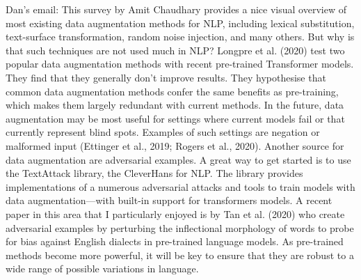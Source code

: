 Dan's email:
This survey by Amit Chaudhary provides a nice visual overview of most existing data augmentation methods for NLP, including lexical substitution, text-surface transformation, random noise injection, and many others. But why is that such techniques are not used much in NLP? Longpre et al. (2020) test two popular data augmentation methods with recent pre-trained Transformer models. They find that they generally don’t improve results. They hypothesise that common data augmentation methods confer the same benefits as pre-training, which makes them largely redundant with current methods. In the future, data augmentation may be most useful for settings where current models fail or that currently represent blind spots. Examples of such settings are negation or malformed input (Ettinger et al., 2019; Rogers et al., 2020).
Another source for data augmentation are adversarial examples. A great way to get started is to use the TextAttack library, the CleverHans for NLP. The library provides implementations of a numerous adversarial attacks and tools to train models with data augmentation—with built-in support for transformers models. A recent paper in this area that I particularly enjoyed is by Tan et al. (2020) who create adversarial examples by perturbing the inflectional morphology of words to probe for bias against English dialects in pre-trained language models. As pre-trained methods become more powerful, it will be key to ensure that they are robust to a wide range of possible variations in language.

